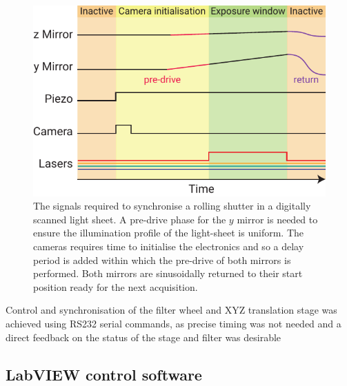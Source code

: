 \begin{figure}
  \centering
  \includegraphics{slit_signals}
  \caption{The signals required to synchronise a rolling shutter in a digitally scanned light sheet.
  A pre-drive phase for the $y$ mirror is needed to ensure the illumination profile of the light-sheet is uniform.
  The cameras requires time to initialise the electronics and so a delay period is added within which the pre-drive of both mirrors is performed.
  Both mirrors are sinusoidally returned to their start position ready for the next acquisition.
  }
  \label{fig:slit_signals}
\end{figure}

Control and synchronisation of the filter wheel and XYZ translation stage was achieved using RS232 serial commands, as precise timing was not needed and a direct feedback on the status of the stage and filter was desirable %

%



\subsection{LabVIEW control software}

